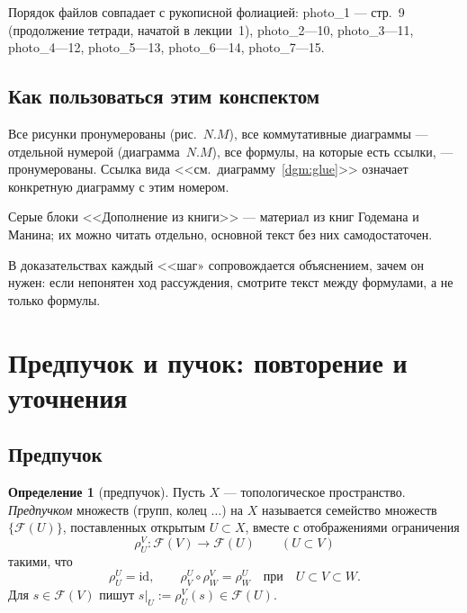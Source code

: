\documentclass[11pt,b5paper]{article}
\newcommand{\id}{\mathrm{id}}
\newcommand{\Shv}[1]{\mathscr{#1}}   %
\newcommand{\res}{\rho}              %
\theoremstyle{plain}
\theoremstyle{definition}
\newtheorem{defninner}[thminner]{Определение}
\theoremstyle{remark}
\newcommand{\thmbeg}{%
  \par\smallskip
  \begin{lrbox}{\thmbox}%
  \begin{minipage}{\linewidth}}
\newcommand{\thmend}{%
  \end{minipage}%
  \end{lrbox}%
  \noindent\usebox{\thmbox}%
  \par\smallskip}
\newenvironment{defn}{\thmbeg\begin{defninner}}{\end{defninner}\thmend}
\newcounter{dgm}[section]
\let\brutsection\section
\renewcommand{\section}{\Needspace{7\baselineskip}\brutsection}
\let\brutsubsection\subsection
\renewcommand{\subsection}{\Needspace{5\baselineskip}\brutsubsection}
\begin{document}
Порядок файлов совпадает с рукописной фолиацией: photo\_1 ---
стр.~9 (продолжение тетради, начатой в лекции~1), photo\_2---10,
photo\_3---11, photo\_4---12, photo\_5---13,
photo\_6---14, photo\_7---15.

\subsection{Как пользоваться этим конспектом}
\leavevmode\par
\begin{bullets}
\item Все рисунки пронумерованы (рис.~$N.M$), все коммутативные
 диаграммы --- отдельной нумерой (диаграмма~$N.M$), все формулы, на
 которые есть ссылки, --- пронумерованы. Ссылка вида
 <<см.~диаграмму~\ref{dgm:glue}>> означает конкретную диаграмму
 с этим номером.
\item Серые блоки <<Дополнение из книги>> --- материал из книг
 Годемана и Манина;
 их можно читать отдельно, основной текст без них самодостаточен.
\item В доказательствах каждый <<шаг» сопровождается объяснением, зачем
 он нужен: если непонятен ход рассуждения, смотрите текст между
 формулами, а не только формулы.
\end{bullets}

\section{Предпучок и пучок: повторение и уточнения}

\subsection{Предпучок}
\leavevmode\par
\begin{defn}[предпучок]
Пусть $X$ --- топологическое пространство. \emph{Предпучком} множеств
(групп, колец $\ldots$) на $X$ называется семейство множеств
$\{\Shv{F}(U)\}$, поставленных открытым $U\subset X$, вместе с
отображениями ограничения
\[
  \res^{V}_{U}\colon\Shv{F}(V)\longrightarrow\Shv{F}(U)
  \qquad (U\subset V)
\]
такими, что
\[
  \res^{U}_{U}=\id,\qquad
  \res^{U}_{V}\circ\res^{V}_{W}=\res^{U}_{W}
  \quad\text{при}\quad U\subset V\subset W.
\]
Для $s\in\Shv{F}(V)$ пишут $s|_{U}:=\res^{V}_{U}(s)\in\Shv{F}(U)$.
\end{defn}
\end{document}
